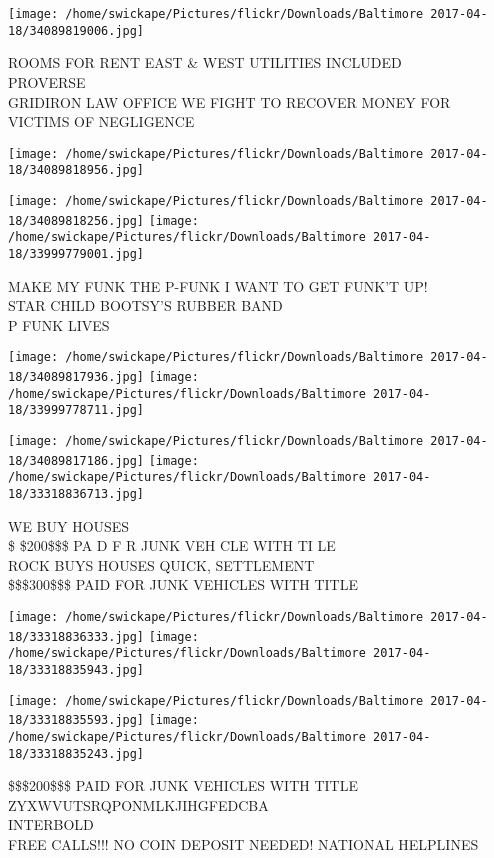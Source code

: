 \documentclass[10pt,letterpaper]{article}
\begin{document}
\texttt{[image: /home/swickape/Pictures/flickr/Downloads/Baltimore 2017-04-18/34089819006.jpg]}

ROOMS FOR RENT EAST \& WEST UTILITIES INCLUDED\\
PROVERSE\\
GRIDIRON LAW OFFICE WE FIGHT TO RECOVER MONEY FOR VICTIMS OF NEGLIGENCE
\pagebreak

\texttt{[image: /home/swickape/Pictures/flickr/Downloads/Baltimore 2017-04-18/34089818956.jpg]}

\vspace{0.25in}
\texttt{[image: /home/swickape/Pictures/flickr/Downloads/Baltimore 2017-04-18/34089818256.jpg]}
\texttt{[image: /home/swickape/Pictures/flickr/Downloads/Baltimore 2017-04-18/33999779001.jpg]}

MAKE MY FUNK THE P{-}FUNK I WANT TO GET FUNK'T UP!\\
STAR CHILD BOOTSY'S RUBBER BAND\\
P FUNK LIVES
\pagebreak

\texttt{[image: /home/swickape/Pictures/flickr/Downloads/Baltimore 2017-04-18/34089817936.jpg]}
\texttt{[image: /home/swickape/Pictures/flickr/Downloads/Baltimore 2017-04-18/33999778711.jpg]}

\texttt{[image: /home/swickape/Pictures/flickr/Downloads/Baltimore 2017-04-18/34089817186.jpg]}
\texttt{[image: /home/swickape/Pictures/flickr/Downloads/Baltimore 2017-04-18/33318836713.jpg]}

WE BUY HOUSES\\
\$ \$200\$\$\$ PA D F R JUNK VEH CLE WITH TI LE\\
ROCK BUYS HOUSES QUICK, SETTLEMENT\\
\$\$\$300\$\$\$ PAID FOR JUNK VEHICLES WITH TITLE
\pagebreak

\texttt{[image: /home/swickape/Pictures/flickr/Downloads/Baltimore 2017-04-18/33318836333.jpg]}
\texttt{[image: /home/swickape/Pictures/flickr/Downloads/Baltimore 2017-04-18/33318835943.jpg]}

\texttt{[image: /home/swickape/Pictures/flickr/Downloads/Baltimore 2017-04-18/33318835593.jpg]}
\texttt{[image: /home/swickape/Pictures/flickr/Downloads/Baltimore 2017-04-18/33318835243.jpg]}

\$\$\$200\$\$\$ PAID FOR JUNK VEHICLES WITH TITLE\\
ZYXWVUTSRQPONMLKJIHGFEDCBA\\
INTERBOLD\\
FREE CALLS!!! NO COIN DEPOSIT NEEDED!  NATIONAL HELPLINES
\pagebreak
\end{document}
